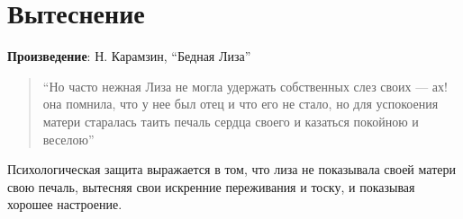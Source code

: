 \section{Вытеснение}

\textbf{Произведение}: Н. Карамзин, “Бедная Лиза”

\begin{quote}
    “Но часто нежная Лиза не могла удержать собственных слез своих — ах! она помнила, что у нее был отец и что его не стало, но для успокоения матери старалась таить печаль сердца своего и казаться покойною и веселою”

\end{quote}
Психологическая защита выражается в том, что лиза не показывала своей матери свою печаль, вытесняя свои искренние переживания и тоску, и показывая хорошее настроение.  
